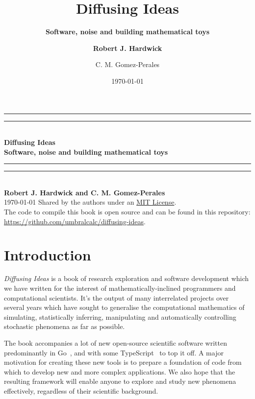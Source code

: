 \documentclass{book}
\title{\Huge \bfseries\sffamily Diffusing Ideas}
\subtitle{\Large \bfseries\sffamily \color{gray75} Software, noise and building mathematical toys}
\author{\bfseries\sffamily Robert J. Hardwick  \and C. M. Gomez-Perales}
\date{\today}
\begin{document}
\begin{titlepage}
\centering
\vspace*{1.5\baselineskip}
{\color{gray75}\rule{13cm}{1.3pt}}\vspace*{-\baselineskip}\vspace*{2pt} %
{\color{gray75}\rule{13cm}{0.4pt}} \\ %
\vspace{1.2\baselineskip} %
{\Huge \bfseries\sffamily Diffusing Ideas} \\ 
\vspace{4mm}
{\Large \bfseries\sffamily \color{gray75} Software, noise and building mathematical toys \\}
\vspace*{0.75\baselineskip}
{\color{gray75}\rule{13cm}{0.4pt}}\vspace*{-\baselineskip}\vspace*{2.75pt} %
{\color{gray75}\rule{13cm}{1.3pt}} \\ %
\vspace{1.0\baselineskip} %
{\large \bfseries\sffamily Robert J. Hardwick and C. M. Gomez-Perales \\
\vspace*{1.2\baselineskip}}
\today
\vfill
Shared by the authors under an \href{https://opensource.org/licenses/MIT}{MIT License}.\\ \vspace{1mm}
The code to compile this book is open source and can be found in this repository: \url{https://github.com/umbralcalc/diffusing-ideas}.
\end{titlepage}

\chapter*{Introduction}

\emph{Diffusing Ideas} is a book of research exploration and software development which we have written for the interest of mathematically-inclined programmers and computational scientists. It's the output of many interrelated projects over several years which have sought to generalise the computational mathematics of simulating, statistically inferring, manipulating and automatically controlling stochastic phenomena as far as possible.

The book accompanies a lot of new open-source scientific software written predominantly in Go~\cite{golang}, and with some TypeScript~\cite{typescriptlang} to top it off. A major motivation for creating these new tools is to prepare a foundation of code from which to develop new and more complex applications. We also hope that the resulting framework will enable anyone to explore and study new phenomena effectively, regardless of their scientific background.
\end{document}
